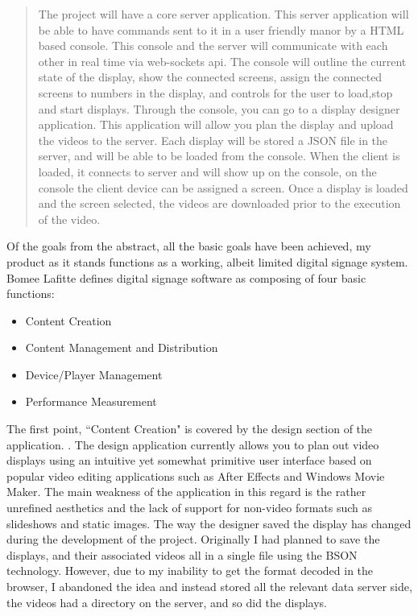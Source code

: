 \documentclass{article}
\begin{document}
\begin{quote}
    The project will have a core server application. This server application will be able to have commands sent to it in a user friendly manor by a HTML based console. This console and the server will communicate with each other in real time via web-sockets api. The console will outline the current state of the display, show the connected screens, assign the connected screens to numbers in the display, and controls for the user to load,stop and start displays. Through the console, you can go to a display designer application. This application will allow you plan the display and upload the videos to the server. Each display will be stored a JSON file in the server, and will be able to be loaded from the console. When the client is loaded, it connects to server and will show up on the console, on the console the client device can be assigned a screen. Once a display is loaded and the screen selected, the videos are downloaded prior to the execution of the video. 
\end{quote}

Of the goals from the abstract, all the basic goals have been achieved, my product as it stands functions as a working, albeit limited digital signage system. Bomee Lafitte defines digital signage software as composing of four basic functions:

\begin{itemize}
    \item Content Creation
    \item Content Management and Distribution
    \item Device/Player Management
    \item Performance Measurement
\end{itemize}
\cite{lafitte_2022}

The first point, ``Content Creation" is covered by the design section of the application. \cite{design_github}. The design application currently allows you to plan out video displays using an intuitive yet somewhat primitive user interface based on popular video editing applications such as After Effects and Windows Movie Maker. The main weakness of the application in this regard is the rather unrefined aesthetics and the lack of support for non-video formats such as slideshows and static images. The way the designer saved the display has changed during the development of the project. Originally I had planned to save the displays, and their associated videos all in a single file using the BSON technology. However, due to my inability to get the format decoded in the browser, I abandoned the idea and instead stored all the relevant data server side, the videos had a directory on the server, and so did the displays. 
\end{document}
